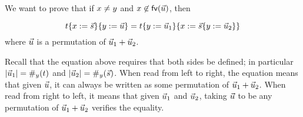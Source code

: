 
We want to prove that if $x \neq y$ and $x \not\in \mathsf{fv}({\vec{u}})$, then

\[
  \subs{\subs{\tm}{\var}{\ls{\tmtwo}}}{\vartwo}{\ls{\tmthree}}
  =
  \subs{
    \subs{\tm}{\vartwo}{\ls{\tmthree}_1}
  }{\var}{
    \subs{\ls{\tmtwo}}{\vartwo}{\ls{\tmthree}_2}
  }
\]
where $\vec{u}$ is a permutation of $\vec{u}_1 + \vec{u}_2$.

Recall that the equation above requires that both sides be defined;
in particular
$|\vec{u}_1| = \#_{y}(t)$
and $|\vec{u}_2| = \#_{y}(\vec{s})$.
When read from left to right, the equation means that given $\vec{u}$,
it can always be written as some permutation of $\vec{u}_1 + \vec{u}_2$.
When read from right to left, it means that given $\vec{u}_1$ and $\vec{u}_2$,
taking $\vec{u}$ to be any permutation of $\vec{u}_1 + \vec{u}_2$
verifies the equality.

